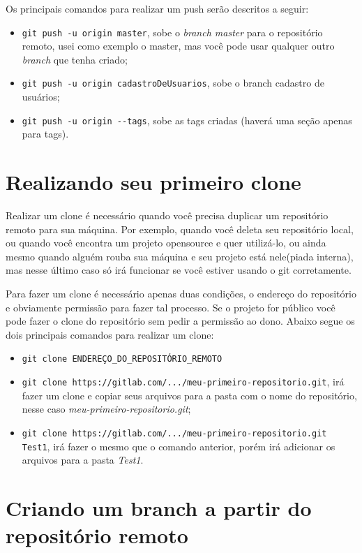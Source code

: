 \documentclass[12pt,openright,oneside,a4paper,english,brazil]{abntex2}
\begin{document}
Os principais comandos para realizar um push serão descritos a seguir:

\begin{itemize}
	\item \verb|git push -u origin master|, sobe o \textit{branch master} para o repositório remoto, usei como exemplo o master, mas você pode usar qualquer outro \textit{branch} que tenha criado;
	\item \verb|git push -u origin cadastroDeUsuarios|, sobe o branch cadastro de usuários;
	\item \verb|git push -u origin --tags|, sobe as tags criadas (haverá uma seção apenas para tags).
\end{itemize}

\section{Realizando seu primeiro clone}

Realizar um clone é necessário quando você precisa duplicar um repositório remoto para sua máquina. Por exemplo, quando você deleta seu repositório local, ou quando você encontra um projeto opensource e quer utilizá-lo, ou ainda mesmo quando alguém rouba sua máquina e seu projeto está nele(piada interna), mas nesse último caso só irá funcionar se você estiver usando o git corretamente.

Para fazer um clone é necessário apenas duas condições, o endereço do repositório e obviamente permissão para fazer tal processo. Se o projeto for público você pode fazer o clone do repositório sem pedir a permissão ao dono. Abaixo segue os dois principais comandos para realizar um clone:

\begin{itemize}
	\item \verb|git clone ENDEREÇO_DO_REPOSITÓRIO_REMOTO|
	\item \verb|git clone https://gitlab.com/.../meu-primeiro-repositorio.git|, irá fazer um clone e copiar seus arquivos para a pasta com o nome do repositório, nesse caso \textit{meu-primeiro-repositorio.git};
	\item \verb|git clone https://gitlab.com/.../meu-primeiro-repositorio.git Test1|, irá fazer o mesmo que o comando anterior, porém irá adicionar os arquivos para a pasta \textit{Test1}.
\end{itemize}

\section{Criando um branch a partir do repositório remoto}
\end{document}
